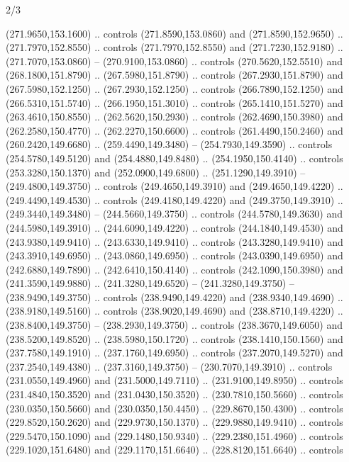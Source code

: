 \begin{flagdescription}{2/3}
\begin{scope}[xshift=0.5\flaglength,yshift=0.5\flagwidth,scale=\flagwidth/259.2]
\begin{scope}[y=0.8pt, x=0.8pt, yscale=-1,shift={(-243,-162)}]
      (271.9650,153.1600) .. controls (271.8590,153.0860) and (271.8590,152.9650) ..
      (271.7970,152.8550) .. controls (271.7970,152.8550) and (271.7230,152.9180) ..
      (271.7070,153.0860) -- (270.9100,153.0860) .. controls (270.5620,152.5510) and
      (268.1800,151.8790) .. (267.5980,151.8790) .. controls (267.2930,151.8790) and
      (267.5980,152.1250) .. (267.2930,152.1250) .. controls (266.7890,152.1250) and
      (266.5310,151.5740) .. (266.1950,151.3010) .. controls (265.1410,151.5270) and
      (263.4610,150.8550) .. (262.5620,150.2930) .. controls (262.4690,150.3980) and
      (262.2580,150.4770) .. (262.2270,150.6600) .. controls (261.4490,150.2460) and
      (260.2420,149.6680) .. (259.4490,149.3480) -- (254.7930,149.3590) .. controls
      (254.5780,149.5120) and (254.4880,149.8480) .. (254.1950,150.4140) .. controls
      (253.3280,150.1370) and (252.0900,149.6800) .. (251.1290,149.3910) --
      (249.4800,149.3750) .. controls (249.4650,149.3910) and (249.4650,149.4220) ..
      (249.4490,149.4530) .. controls (249.4180,149.4220) and (249.3750,149.3910) ..
      (249.3440,149.3480) -- (244.5660,149.3750) .. controls (244.5780,149.3630) and
      (244.5980,149.3910) .. (244.6090,149.4220) .. controls (244.1840,149.4530) and
      (243.9380,149.9410) .. (243.6330,149.9410) .. controls (243.3280,149.9410) and
      (243.3910,149.6950) .. (243.0860,149.6950) .. controls (243.0390,149.6950) and
      (242.6880,149.7890) .. (242.6410,150.4140) .. controls (242.1090,150.3980) and
      (241.3590,149.9880) .. (241.3280,149.6520) -- (241.3280,149.3750) --
      (238.9490,149.3750) .. controls (238.9490,149.4220) and (238.9340,149.4690) ..
      (238.9180,149.5160) .. controls (238.9020,149.4690) and (238.8710,149.4220) ..
      (238.8400,149.3750) -- (238.2930,149.3750) .. controls (238.3670,149.6050) and
      (238.5200,149.8520) .. (238.5980,150.1720) .. controls (238.1410,150.1560) and
      (237.7580,149.1910) .. (237.1760,149.6950) .. controls (237.2070,149.5270) and
      (237.2540,149.4380) .. (237.3160,149.3750) -- (230.7070,149.3910) .. controls
      (231.0550,149.4960) and (231.5000,149.7110) .. (231.9100,149.8950) .. controls
      (231.4840,150.3520) and (231.0430,150.3520) .. (230.7810,150.5660) .. controls
      (230.0350,150.5660) and (230.0350,150.4450) .. (229.8670,150.4300) .. controls
      (229.8520,150.2620) and (229.9730,150.1370) .. (229.9880,149.9410) .. controls
      (229.5470,150.1090) and (229.1480,150.9340) .. (229.2380,151.4960) .. controls
      (229.1020,151.6480) and (229.1170,151.6640) .. (228.8120,151.6640) .. controls

\end{scope}
\end{scope}
\end{flagdescription}
